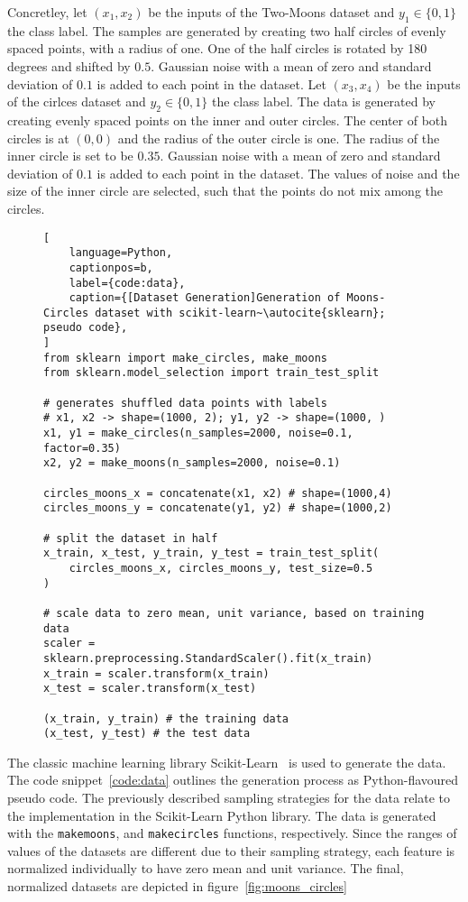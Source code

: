 Concretley, let $( x_1 , x_2 )$ be the inputs of the Two-Moons dataset and $y_1 \in \{0,1\}$ the class label.
The samples are generated by creating two half circles of evenly spaced points, with a radius of one.
One of the half circles is rotated by 180 degrees and shifted by $0.5$.
Gaussian noise with a mean of zero and standard deviation of $0.1$ is added to each point in the dataset.
Let $( x_3 , x_4 )$ be the inputs of the cirlces dataset and $y_2 \in \{0,1\}$ the class label.
The data is generated by creating evenly spaced points on the inner and outer circles. 
The center of both circles is at $(0,0)$ and the radius of the outer circle is one.
The radius of the inner circle is set to be $0.35$.
Gaussian noise with a mean of zero and standard deviation of $0.1$ is added to each point in the dataset.
The values of noise and the size of the inner circle are selected, such that the points do not mix among the circles.

\begin{figure}[t]
\centering
\begin{minipage}{\linewidth}
\begin{lstlisting}[
    language=Python,
    captionpos=b, 
    label={code:data},
    caption={[Dataset Generation]Generation of Moons-Circles dataset with scikit-learn~\autocite{sklearn}; pseudo code},
]
from sklearn import make_circles, make_moons
from sklearn.model_selection import train_test_split

# generates shuffled data points with labels
# x1, x2 -> shape=(1000, 2); y1, y2 -> shape=(1000, ) 
x1, y1 = make_circles(n_samples=2000, noise=0.1, factor=0.35)
x2, y2 = make_moons(n_samples=2000, noise=0.1)

circles_moons_x = concatenate(x1, x2) # shape=(1000,4)
circles_moons_y = concatenate(y1, y2) # shape=(1000,2)

# split the dataset in half
x_train, x_test, y_train, y_test = train_test_split(
    circles_moons_x, circles_moons_y, test_size=0.5
)

# scale data to zero mean, unit variance, based on training data
scaler = sklearn.preprocessing.StandardScaler().fit(x_train)
x_train = scaler.transform(x_train)
x_test = scaler.transform(x_test)

(x_train, y_train) # the training data
(x_test, y_test) # the test data
\end{lstlisting}
\end{minipage}
\end{figure}

The classic machine learning library Scikit-Learn~\autocite{sklearn} is used to generate the data. 
The code snippet~\ref{code:data} outlines the generation process as Python-flavoured pseudo code.
The previously described sampling strategies for the data relate to the implementation in the Scikit-Learn Python library.
The data is generated with the \lstinline{makemoons}, and \lstinline{makecircles} functions, respectively.
Since the ranges of values of the datasets are different due to their sampling strategy, each feature is normalized individually to have zero mean and unit variance.
The final, normalized datasets are depicted in figure~\ref{fig:moons_circles}

